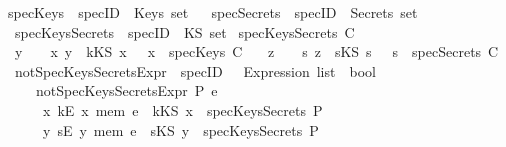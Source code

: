 \begin{isabellebody}
\isanewline
%
\isanewline
{}\isamarkupfalse%
\isanewline
\ specKeys\ {\isacharcolon}{\isacharcolon}\ {\isachardoublequoteopen}specID\ {\isasymRightarrow}\ Keys\ set{\isachardoublequoteclose}\isanewline
%
\isanewline
{}\isamarkupfalse%
\ \isanewline
\ specSecrets\ {\isacharcolon}{\isacharcolon}\ {\isachardoublequoteopen}specID\ {\isasymRightarrow}\ Secrets\ set{\isachardoublequoteclose}\isanewline
\isanewline
%
\isanewline
{}\isamarkupfalse%
\isanewline
\ \ specKeysSecrets\ {\isacharcolon}{\isacharcolon}\ {\isachardoublequoteopen}specID\ {\isasymRightarrow}\ KS\ set{\isachardoublequoteclose}\isanewline
{}\isanewline
\ {\isachardoublequoteopen}specKeysSecrets\ C\ {\isasymequiv}\isanewline
\ \ {\isacharbraceleft}y\ {\isachardot}\ \ {\isasymexists}\ x{\isachardot}\ y\ {\isacharequal}\ {\isacharparenleft}kKS\ x{\isacharparenright}\ \ {\isasymand}\ {\isacharparenleft}x\ {\isasymin}\ {\isacharparenleft}specKeys\ C{\isacharparenright}{\isacharparenright}{\isacharbraceright}\ {\isasymunion}\isanewline
\ \ {\isacharbraceleft}z\ {\isachardot}\ \ {\isasymexists}\ s{\isachardot}\ z\ {\isacharequal}\ {\isacharparenleft}sKS\ s{\isacharparenright}\ \ {\isasymand}\ {\isacharparenleft}s\ {\isasymin}\ {\isacharparenleft}specSecrets\ C{\isacharparenright}{\isacharparenright}{\isacharbraceright}{\isachardoublequoteclose}\isanewline
\isanewline
%
\isanewline
%
\isanewline
{}\isamarkupfalse%
\isanewline
\ \ notSpecKeysSecretsExpr\ {\isacharcolon}{\isacharcolon}\ {\isachardoublequoteopen}specID\ {\isasymRightarrow}\ \ Expression\ list\ {\isasymRightarrow}\ bool{\isachardoublequoteclose}\isanewline
{}\isanewline
\ \ \ \ \ {\isachardoublequoteopen}notSpecKeysSecretsExpr\ P\ e\ {\isasymequiv}\isanewline
\ \ \ \ \ {\isacharparenleft}{\isasymforall}\ x{\isachardot}\ {\isacharparenleft}kE\ x{\isacharparenright}\ mem\ e\ {\isasymlongrightarrow}\ {\isacharparenleft}kKS\ x{\isacharparenright}\ {\isasymnotin}\ specKeysSecrets\ P{\isacharparenright}\ {\isasymand}\isanewline
\ \ \ \ \ {\isacharparenleft}{\isasymforall}\ y{\isachardot}\ {\isacharparenleft}sE\ y{\isacharparenright}\ mem\ e\ {\isasymlongrightarrow}\ {\isacharparenleft}sKS\ y{\isacharparenright}\ {\isasymnotin}\ specKeysSecrets\ P{\isacharparenright}{\isachardoublequoteclose}\isanewline

\end{isabellebody}
